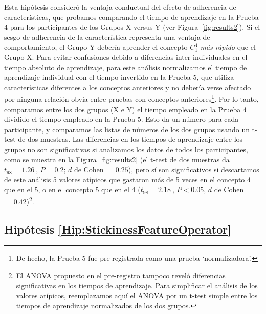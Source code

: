 Esta hipótesis consideró la ventaja conductual del efecto de adherencia de características, que probamos comparando el tiempo de aprendizaje en la Prueba 4 para los participantes de los Grupos X versus Y (ver Figura~\ref{fig:results2}). Si el sesgo de adherencia de la característica representa una ventaja de comportamiento, el Grupo Y debería aprender el concepto $ C^4_1 $ \emph{más rápido} que el Grupo X. Para evitar confusiones debido a diferencias inter-individuales en el tiempo absoluto de aprendizaje, para este análisis normalizamos el tiempo de aprendizaje individual con el tiempo invertido en la Prueba 5, que utiliza características diferentes a los conceptos anteriores y no debería verse afectado por ninguna relación obvia entre pruebas con conceptos anteriores\footnote{De hecho, la Prueba 5 fue pre-registrada como una prueba `normalizadora'.}. Por lo tanto, comparamos entre los dos grupos (X e Y) el tiempo empleado en la Prueba 4 dividido el tiempo empleado en la Prueba 5. Esto da un número para cada participante, y comparamos las listas de números de los dos grupos usando un t-test de dos muestras. Las diferencias en los tiempos de aprendizaje entre los grupos no son significativas si analizamos los datos de todos los participantes, como se muestra en la Figura~\ref{fig:results2} (el t-test de dos muestras da $ t_{98} = 1.26 \ $, $ P = 0.2 $; $d$ de Cohen $= 0.25 $), pero sí son significativos si descartamos de este análisis 5 valores atípicos que gastaron más de 5 veces en el concepto 4 que en el 5, o en el concepto 5 que en el 4 ($ t_{98} = 2.18 \ $, $ P <0.05 $, $ d$ de Cohen $= 0.42 $)\footnote{El ANOVA propuesto en el pre-registro tampoco reveló diferencias significativas en los tiempos de aprendizaje. Para simplificar el análisis de los valores atípicos, reemplazamos aquí el ANOVA por un t-test simple entre los tiempos de aprendizaje normalizados de los dos grupos.}.



\subsection{Hipótesis \ref{Hip:StickinessFeatureOperator}} \label{Results:StickinessFeatureOperator} 

